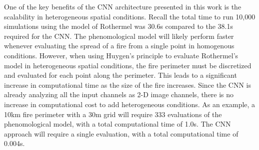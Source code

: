 \documentclass[smallcondensed]{svjour3}     %
\begin{document}
One of the key benefits of the CNN architecture presented in
this work is the scalability in heterogeneous spatial conditions.
Recall the total time to run 10,000 simulations using the model
of Rothermel was 30.6s compared to the 38.1s required for the CNN.
The phenomological model will likely perform faster whenever
evaluating the spread of a fire from a single point in homogenous
conditions. However,
when using Huygen's principle to evaluate Rothermel's model in
heterogeneous spatial conditions, the
fire perimeter must be discretized and evaluated for each point
along the perimeter. This leads to a significant increase in
computational time as the size of the fire increases.
Since the CNN is already analyzing all the input channels as 2-D
image channels, there is no increase in computational cost to
add heterogeneous conditions.
As an
example, a 10km fire perimeter with a 30m grid will require 333
evaluations of the phenomological model, with a total computational
time of 1.0s.
The CNN approach will require a single evaluation, with a total
computational time of 0.004s. 
\end{document}
